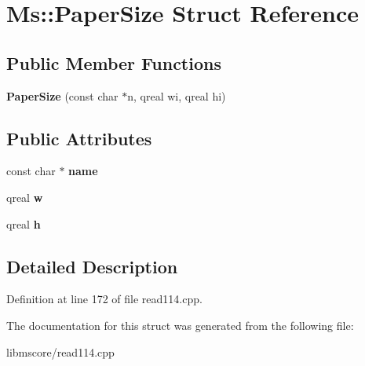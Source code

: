 \hypertarget{struct_ms_1_1_paper_size}{}\section{Ms\+:\+:Paper\+Size Struct Reference}
\label{struct_ms_1_1_paper_size}
\subsection*{Public Member Functions}
\begin{DoxyCompactItemize}
\item 
\mbox{\label{struct_ms_1_1_paper_size_a5358fbba610a2c4bb09f4b441d0067c3}} 
{\bfseries Paper\+Size} (const char $\ast$n, qreal wi, qreal hi)
\end{DoxyCompactItemize}
\subsection*{Public Attributes}
\begin{DoxyCompactItemize}
\item 
\mbox{\label{struct_ms_1_1_paper_size_a02f4d709356b6b7f5e4d78bde07fec93}} 
const char $\ast$ {\bfseries name}
\item 
\mbox{\label{struct_ms_1_1_paper_size_ae335aeffea165fe318c719b20614ff77}} 
qreal {\bfseries w}
\item 
\mbox{\label{struct_ms_1_1_paper_size_a7a3cc529a16f48deb825971c9c5560ca}} 
qreal {\bfseries h}
\end{DoxyCompactItemize}


\subsection{Detailed Description}


Definition at line 172 of file read114.\+cpp.



The documentation for this struct was generated from the following file\+:\begin{DoxyCompactItemize}
\item 
libmscore/read114.\+cpp\end{DoxyCompactItemize}
